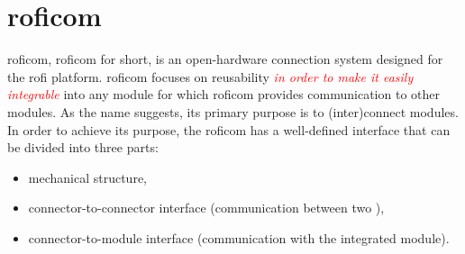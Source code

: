 \documentclass[
  digital,     %
  oneside,     %
  nosansbold,  %
  nocolorbold, %
  nolof,         %
  nolot,         %
]{fithesis4}
\newcommand{\TODO}[1]{\textcolor{red}{\textit{#1}}}
\newcommand{\TODOLIST}[1]{}
\begin{document}
\section[ RoFI Communication Mechanism ]{ \acrlong{roficom} } \label{sec:roficom}
\TODOLIST{
\begin{itemize}
    \item Explain \acrshort{roficom}
    \item Describe components --- shirt, clip and body
    \item Describe board --- RAM: 36KB, Flash: 128KB, ...
\end{itemize}
}

\acrlong{roficom}, \acrshort{roficom} for short, is an open-hardware connection system designed for the \acrshort{rofi} platform. \acrshort{roficom} focuses on reusability \TODO{in order to make it easily integrable} into any module for which \acrshort{roficom} provides
communication to other modules. As the name suggests, its primary purpose is to (inter)connect modules. In order to achieve its purpose, the \acrshort{roficom} has a well-defined interface that can be divided into three parts:
\begin{itemize}
    \item mechanical structure,
    \item connector-to-connector interface (communication between two ),
    \item connector-to-module interface (communication with the integrated module).
\end{itemize}
\end{document}

